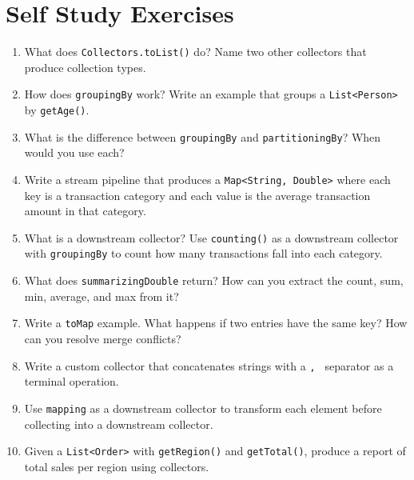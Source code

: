 \documentclass[twoside=false,DIV=14]{scrartcl}
\begin{document}
\section*{Self Study Exercises}
\begin{enumerate}
\item What does \texttt{Collectors.toList()} do?  Name two other collectors that produce collection types.

\item How does \texttt{groupingBy} work?  Write an example that groups a \texttt{List<Person>} by \texttt{getAge()}.

\item What is the difference between \texttt{groupingBy} and \texttt{partitioningBy}?  When would you use each?

\item Write a stream pipeline that produces a \texttt{Map<String, Double>} where each key is a transaction category and each value is the average transaction amount in that category.

\item What is a downstream collector?  Use \texttt{counting()} as a downstream collector with \texttt{groupingBy} to count how many transactions fall into each category.

\item What does \texttt{summarizingDouble} return?  How can you extract the count, sum, min, average, and max from it?

\item Write a \texttt{toMap} example.  What happens if two entries have the same key?  How can you resolve merge conflicts?

\item Write a custom collector that concatenates strings with a \texttt{, } separator as a terminal operation.

\item Use \texttt{mapping} as a downstream collector to transform each element before collecting into a downstream collector.

\item Given a \texttt{List<Order>} with \texttt{getRegion()} and \texttt{getTotal()}, produce a report of total sales per region using collectors.
\end{enumerate}
\end{document}
